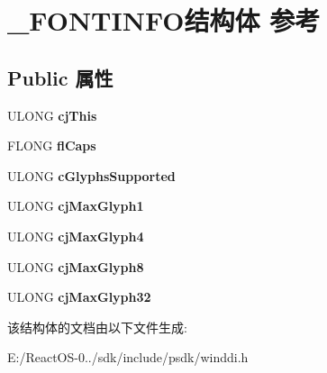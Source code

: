 \hypertarget{struct___f_o_n_t_i_n_f_o}{}\section{\+\_\+\+F\+O\+N\+T\+I\+N\+F\+O结构体 参考}
\label{struct___f_o_n_t_i_n_f_o}
\subsection*{Public 属性}
\begin{DoxyCompactItemize}
\item 
\mbox{\label{struct___f_o_n_t_i_n_f_o_aa2beac6fa60008481fc53b99fd829be5}} 
U\+L\+O\+NG {\bfseries cj\+This}
\item 
\mbox{\label{struct___f_o_n_t_i_n_f_o_ae252807d68e41c8b99e99d0762bad646}} 
F\+L\+O\+NG {\bfseries fl\+Caps}
\item 
\mbox{\label{struct___f_o_n_t_i_n_f_o_aa2ab1b5cf5fd3e16c7dc1f755ca0b585}} 
U\+L\+O\+NG {\bfseries c\+Glyphs\+Supported}
\item 
\mbox{\label{struct___f_o_n_t_i_n_f_o_a78c1370087803a725a7616c400b5fdb3}} 
U\+L\+O\+NG {\bfseries cj\+Max\+Glyph1}
\item 
\mbox{\label{struct___f_o_n_t_i_n_f_o_a5676e8cdb17d00ccdace0112563ad0d6}} 
U\+L\+O\+NG {\bfseries cj\+Max\+Glyph4}
\item 
\mbox{\label{struct___f_o_n_t_i_n_f_o_a8f3bbe33a078c03f26431b115ae0fc96}} 
U\+L\+O\+NG {\bfseries cj\+Max\+Glyph8}
\item 
\mbox{\label{struct___f_o_n_t_i_n_f_o_a873d367667dd53fe5931855284f08e6f}} 
U\+L\+O\+NG {\bfseries cj\+Max\+Glyph32}
\end{DoxyCompactItemize}


该结构体的文档由以下文件生成\+:\begin{DoxyCompactItemize}
\item 
E\+:/\+React\+O\+S-\/0../sdk/include/psdk/winddi.\+h\end{DoxyCompactItemize}
